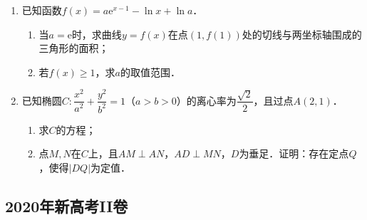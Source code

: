 \begin{description}
\begin{enumerate}[leftmargin=5pt]
\begin{enumerate}[label=(\arabic*)]
            \item 已知$PD=AD=1$，$Q$为$l$上的点，求$PB$与平面$QCD$所成角的正弦值的最大值．
        \end{enumerate}        \item 已知函数$f(x)=a\mathrm{e}^{x-1}-\ln x+\ln a$．
        \begin{enumerate}[label=(\arabic*)]
            \item 当$a=\mathrm{e}$时，求曲线$y=f(x)$在点$(1,f(1))$处的切线与两坐标轴围成的三角形的面积；
            \item 若$f(x)\geqslant 1$，求$a$的取值范围．
        \end{enumerate}
        \item 已知椭圆$C:\dfrac{x^{2}}{a^{2}}+\dfrac{y^{2}}{b^{2}}=1$（$a>b>0$）的离心率为$\dfrac{\sqrt{2}}{2}$，且过点$A(2,1)$．
        \begin{enumerate}[label=(\arabic*)]
            \item 求$C$的方程；
            \item 点$M,N$在$C$上，且$AM\perp AN$，$AD\perp MN$，$D$为垂足．证明：存在定点$Q$，使得$|DQ|$为定值．
        \end{enumerate}
    \end{enumerate}
\end{description}
\clearpage


\subsection{2020年新高考II卷}\label{gk:2020年新高考II卷}

